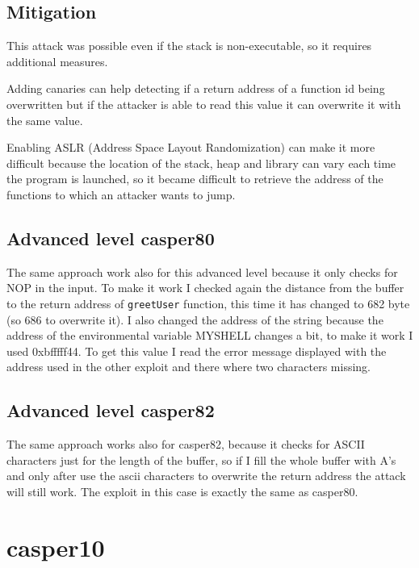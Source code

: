 \documentclass[a4paper,12pt]{article}
\begin{document}
\subsection{Mitigation}

This attack was possible even if the stack is non-executable, so it requires additional measures.

Adding canaries can help detecting if a return address of a function id being overwritten but if the attacker is able to read this value it can overwrite it with the same value.

Enabling ASLR (Address Space Layout Randomization) can make it more difficult because the location of the stack, heap and library can vary each time the program is launched, so it became difficult to retrieve the address of the functions to which an attacker wants to jump.



\subsection{Advanced level casper80}

The same approach work also for this advanced level because it only checks for NOP in the input. To make it work I checked again the distance from the buffer to the return address of \texttt{greetUser} function, this time it has changed to 682 byte (so 686 to overwrite it). I also changed the address of the string because the address of the environmental variable MYSHELL changes a bit, to make it work I used 0xbfffff44. To get this value I read the error message displayed with the address used in the other exploit and there where two characters missing.

\subsection{Advanced level casper82}

The same approach works also for casper82, because it checks for ASCII characters just for the length of the buffer, so if I fill the whole buffer with A's and only after use the ascii characters to overwrite the return address the attack will still work. The exploit in this case is exactly the same as casper80.



\section{casper10}
\end{document}
